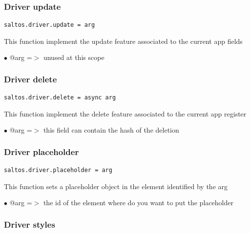 \documentclass[a4paper]{article}
\begin{document}
\hypertarget{toc176}{}
\subsubsection{Driver update}

\begin{lstlisting}
saltos.driver.update = arg
\end{lstlisting}

This function implement the update feature associated to the current app fields

\begin{compactitem}
\item[\color{myblue}$\bullet$] @arg =$>$ unused at this scope
\end{compactitem}

\hypertarget{toc177}{}
\subsubsection{Driver delete}

\begin{lstlisting}
saltos.driver.delete = async arg
\end{lstlisting}

This function implement the delete feature associated to the current app register

\begin{compactitem}
\item[\color{myblue}$\bullet$] @arg =$>$ this field can contain the hash of the deletion
\end{compactitem}

\hypertarget{toc178}{}
\subsubsection{Driver placeholder}

\begin{lstlisting}
saltos.driver.placeholder = arg
\end{lstlisting}

This function sets a placeholder object in the element identified by the arg

\begin{compactitem}
\item[\color{myblue}$\bullet$] @arg =$>$ the id of the element where do you want to put the placeholder
\end{compactitem}

\hypertarget{toc179}{}
\subsubsection{Driver styles}
\end{document}
